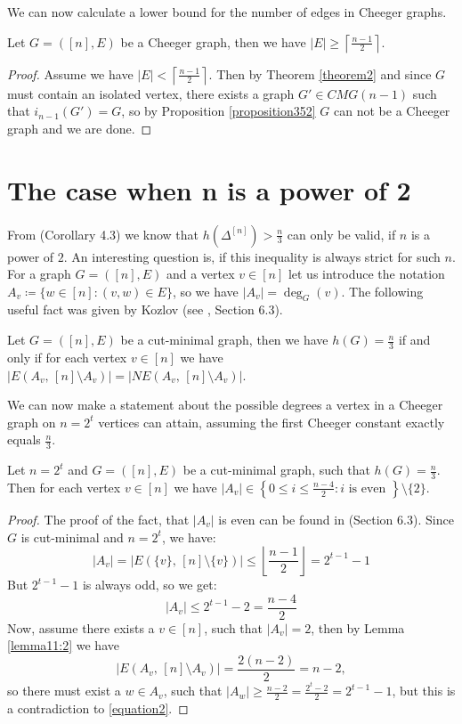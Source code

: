 We can now calculate a lower bound for the number of edges in Cheeger graphs.

\begin{prop}
Let \(G=([n],E)\) be a Cheeger graph, then we have \(|E|\geq\left\lceil\frac{n-1}{2}\right\rceil\).
\begin{proof}
Assume we have \(|E|<\left\lceil\frac{n-1}{2}\right\rceil\). Then by Theorem \ref{theorem2} and since \(G\) must contain an isolated vertex, there exists a graph \(G'\in CMG(n-1)\) such that \(i_{n-1}(G')=G\), so by Proposition \ref{proposition352} \(G\) can not be a Cheeger graph and we are done.
\end{proof}
\end{prop}

\section{The case when n is a power of 2}

From \cite{1} (Corollary 4.3) we know that \(h(\Delta^{[n]})>\frac{n}{3}\) can only be valid, if \(n\) is a power of \(2\). An interesting question is, if this inequality is always strict for such \(n\). For a graph \(G=([n],E)\) and a vertex \(v\in [n]\) let us introduce the notation\\
\(A_v\coloneqq \{w\in [n]:(v,w)\in E\}\), so we have \(|A_v|=\deg_G(v)\). The following useful fact was given by Kozlov (see \cite{1}, Section 6.3).

\begin{lem}\label{lemma11:2}
Let \(G=([n],E)\) be a cut-minimal graph, then we have \(h(G)=\frac{n}{3}\) if and only if for each vertex \(v\in [n]\) we have \(|E(A_v\text{, }[n]\setminus A_v)|=|NE(A_v\text{, }[n]\setminus A_v)|\).
\end{lem}

We can now make a statement about the possible degrees a vertex in a Cheeger graph on \(n=2^t\) vertices can attain, assuming the first Cheeger constant exactly equals \(\frac{n}{3}\).

\begin{prop}\label{proposition321}
Let \(n=2^t\) and \(G=([n],E)\) be a cut-minimal graph, such that \(h(G)=\frac{n}{3}\). Then for each vertex \(v\in [n]\) we have \(|A_v|\in\left\{0\leq i\leq\frac{n-4}{2}:i\text{ is even }\right\}\setminus\{2\}\).
\begin{proof}
The proof of the fact, that \(|A_v|\) is even can be found in \cite{1} (Section 6.3). Since \(G\) is cut-minimal and \(n=2^t\), we have:
\[
|A_v|=|E(\{v\}\text{, }[n]\setminus\{v\})|\leq\left\lfloor\frac{n-1}{2}\right\rfloor=2^{t-1}-1
\]
But \(2^{t-1}-1\) is always odd, so we get:
\begin{equation}\label{equation2}
|A_v|\leq 2^{t-1}-2=\frac{n-4}{2}
\end{equation}
Now, assume there exists a \(v\in [n]\), such that \(|A_v|=2\), then by Lemma \ref{lemma11:2} we have
\[
|E(A_v\text{, }[n]\setminus A_v)|=\frac{2(n-2)}{2}=n-2,
\]
so there must exist a \(w\in A_v\), such that \(|A_w|\geq\frac{n-2}{2}=\frac{2^t-2}{2}=2^{t-1}-1\), but this is a contradiction to \ref{equation2}.
\end{proof}
\end{prop}

